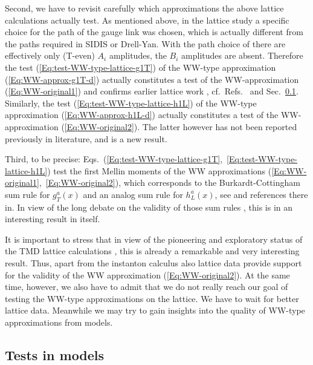 \documentclass[a4paper,11pt]{article}
\begin{document}
Second, we have to revisit carefully which approximations the above
lattice calculations actually test. As mentioned above, in
the lattice study \cite{Hagler:2009mb,Musch:2010ka} a specific choice for
the path of the gauge link was chosen, which is actually different
from the paths required in SIDIS or Drell-Yan. With the path choice of
\cite{Hagler:2009mb,Musch:2010ka} there are effectively only (T-even)
$A_i$ amplitudes, the $B_i$ amplitudes are absent.
Therefore the test (\ref{Eq:test-WW-type-lattice-g1T}) of the WW-type
approximation (\ref{Eq:WW-approx-g1T-d}) actually constitutes a test
of the WW-approximation (\ref{Eq:WW-original1}) and confirms
earlier lattice work \cite{Gockeler:2000ja,Gockeler:2005vw},
cf.\ Refs.~\cite{Metz:2008ib,Teckentrup:2009tk} and
Sec.~\ref{Sec-3.6:models}.
Similarly, the test (\ref{Eq:test-WW-type-lattice-h1L}) of the
WW-type approximation (\ref{Eq:WW-approx-h1L-d}) actually constitutes
a test of the WW-approximation (\ref{Eq:WW-original2}). The latter
however has not been reported previously in literature, and is a
new result.

Third, to be precise:
Eqs.~(\ref{Eq:test-WW-type-lattice-g1T},~\ref{Eq:test-WW-type-lattice-h1L})
test the first Mellin moments of the WW approximations
(\ref{Eq:WW-original1},~\ref{Eq:WW-original2}), which corresponds to the
Burkardt-Cottingham sum rule for $g_T^a(x)$ and an analog sum rule for
$h_L^a(x)$, see \cite{Jaffe:1996zw} and references there in.
In view of the long debate on the validity of those sum rules
\cite{Burkardt:2001iy,Bass:2003vp,Efremov:2002qh}, this is in
an interesting result in itself.

It is important to stress that in view of the pioneering and
exploratory status of the TMD lattice calculations
\cite{Hagler:2009mb,Musch:2010ka}, this is already a remarkable and very
interesting result. Thus, apart from the instanton calculus
\cite{Dressler:1999hc} also lattice data provide support for
the validity of the WW approximation (\ref{Eq:WW-original2}).
At the same time, however, we also have to admit that we do
not really reach our goal of testing the WW-type approximations
on the lattice. We have to wait for better lattice data. 
Meanwhile we may try to gain insights into the quality of
WW-type approximations from models.




\subsection{Tests in models}
\label{Sec-3.6:models}
\end{document}
